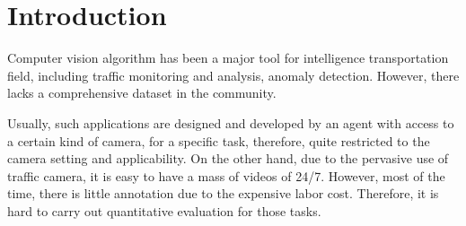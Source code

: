 \section{Introduction}


Computer vision algorithm has been a major tool for intelligence transportation field, including traffic monitoring and analysis, anomaly detection. 
However, there lacks a comprehensive dataset in the community.

Usually, such applications are designed and developed by an agent with access to a certain kind of camera, for a specific task, therefore, quite restricted to the camera setting and applicability.
On the other hand, due to the pervasive use of traffic camera, it is easy to have a mass of videos of 24/7. However, most of the time, there is little annotation due to the expensive labor cost. 
Therefore, it is hard to carry out quantitative evaluation for those tasks.
